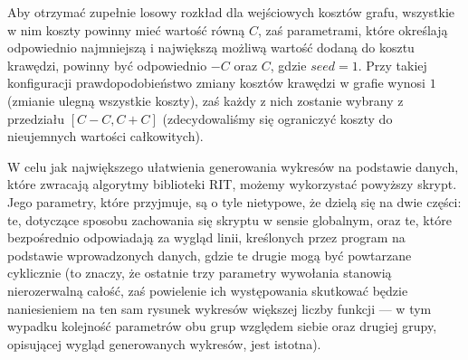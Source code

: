 Aby otrzymać zupełnie losowy rozkład dla wejściowych kosztów grafu, wszystkie w nim koszty powinny mieć wartość równą $C$, zaś parametrami, które określają odpowiednio najmniejszą i największą możliwą wartość dodaną do kosztu krawędzi, powinny być odpowiednio $-C$ oraz $C$, gdzie $seed = 1$. Przy takiej konfiguracji prawdopodobieństwo zmiany kosztów krawędzi w grafie wynosi $1$ (zmianie ulegną wszystkie koszty), zaś każdy z nich zostanie wybrany z przedziału $\left[ C - C, C + C \right]$ (zdecydowaliśmy się ograniczyć koszty do nieujemnych wartości całkowitych).


W celu jak największego ułatwienia generowania wykresów na podstawie danych, które zwracają algorytmy biblioteki \textsc{RIT}, możemy wykorzystać powyższy skrypt. Jego parametry, które przyjmuje, są o tyle nietypowe, że dzielą się na dwie części: te, dotyczące sposobu zachowania się skryptu w sensie globalnym, oraz te, które bezpośrednio odpowiadają za wygląd linii, kreślonych przez program na podstawie wprowadzonych danych, gdzie te drugie mogą być powtarzane cyklicznie (to znaczy, że ostatnie trzy parametry wywołania stanowią nierozerwalną całość, zaś powielenie ich występowania skutkować będzie naniesieniem na ten sam rysunek wykresów większej liczby funkcji --- w tym wypadku kolejność parametrów obu grup względem siebie oraz drugiej grupy, opisującej wygląd generowanych wykresów, jest istotna).

